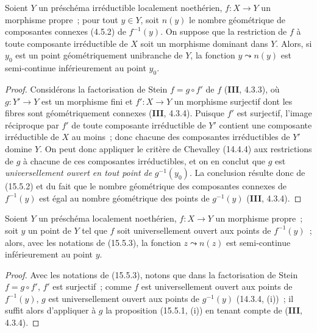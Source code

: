 \begin{proposition}[15.5.3]
\label{IV.15.5.3-fr}
Soient $Y$ un préschéma irréductible localement noethérien, $f:X\to Y$ un morphisme propre~; pour tout $y\in Y$, soit $n(y)$ le nombre géométrique de composantes connexes \textup{(4.5.2)} de $f^{-1}(y)$. On suppose que la restriction de $f$ à toute composante irréductible de $X$ soit un morphisme dominant dans $Y$. Alors, si $y_0$ est un point géométriquement unibranche de $Y$, la fonction $y\leadsto n(y)$ est semi-continue inférieurement au point $y_0$.
\end{proposition}

\begin{proof}
Considérons la factorisation de Stein $f=g\circ f'$ de $f$ (\textbf{III}, 4.3.3), où $g:Y'\to Y$ est un morphisme fini et $f':X\to Y$ un morphisme surjectif dont les fibres sont géométriquement connexes (\textbf{III}, 4.3.4). Puisque $f'$ est surjectif, l'image réciproque par $f'$ de toute composante irréductible de $Y'$ contient une composante irréductible de $X$ au moins~; donc chacune des composantes irréductibles de $Y'$ domine $Y$. On peut donc appliquer le critère de Chevalley (14.4.4) aux restrictions de $g$ à chacune de ces composantes irréductibles, et on en conclut que $g$ est \emph{universellement ouvert en tout point de} $g^{-1}(y_0)$. La conclusion résulte donc de (15.5.2) et du fait que le nombre géométrique des composantes connexes de $f^{-1}(y)$ est égal au nombre géométrique des points de $g^{-1}(y)$ (\textbf{III}, 4.3.4).
\end{proof}

\begin{corollary}[15.5.4]
\label{IV.15.5.4-fr}
Soient $Y$ un préschéma localement noethérien, $f:X\to Y$ un morphisme propre~; soit $y$ un point de $Y$ tel que $f$ soit universellement ouvert aux points de $f^{-1}(y)$~;
alors, avec les notations de \textup{(15.5.3)}, la fonction $z\leadsto n(z)$ est semi-continue inférieurement au point $y$.
\end{corollary}

\begin{proof}
Avec les notations de (15.5.3), notons que dans la factorisation de Stein $f=g\circ f'$, $f'$ est surjectif~; comme $f$ est universellement ouvert aux points de $f^{-1}(y)$, $g$ est universellement ouvert aux points de $g^{-1}(y)$ (14.3.4, (i))~; il suffit alors d'appliquer à $g$ la proposition (15.5.1, (i)) en tenant compte de (\textbf{III}, 4.3.4).
\end{proof}

